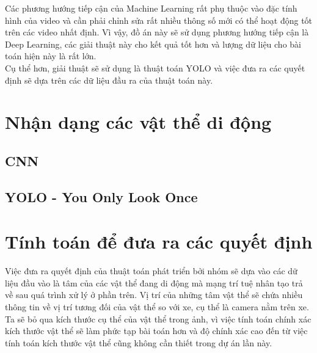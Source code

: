 \documentclass[a4paper,10pt]{article}
\begin{document}
Các phương hướng tiếp cận của Machine Learning rất phụ thuộc vào đặc tính hình của video và cần phải chỉnh sửa rất nhiều thông số mới có thể hoạt động tốt trên các video nhất định. Vì vậy, đồ án này sẽ sử dụng phương hướng tiếp cận là Deep Learning, các giải thuật này cho kết quả tốt hơn và lượng dữ liệu cho bài toán hiện này là rất lớn.
\\
Cụ thể hơn, giải thuật sẽ sử dụng là thuật toán YOLO và việc đưa ra các quyết định sẽ dựa trên các dữ liệu đầu ra của thuật toán này.

\section{Nhận dạng các vật thể di động}
    \subsection{CNN}
	\subsection{YOLO - You Only Look Once}
\section{Tính toán để đưa ra các quyết định}
	Việc đưa ra quyết định của thuật toán phát triển bởi nhóm sẽ dựa vào các dữ liệu đầu vào là tâm của các vật thể đang di động mà mạng trí tuệ nhân tạo trả về sau quá trình xử lý ở phần trên. Vị trí của những tâm vật thể sẽ chứa nhiều thông tin về vị trí tương đối của vật thể so với xe, cụ thể là camera nằm trên xe. Ta sẽ bỏ qua kích thước cụ thể của vật thể trong ảnh, vì việc tính toán chính xác kích thước vật thể sẽ làm phức tạp bài toán hơn và độ chính xác cao đến từ việc tính toán kích thước vật thể cũng không cần thiết trong dự án lần này.
	
\end{document}
